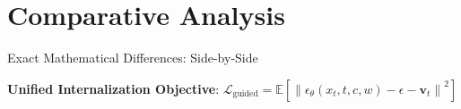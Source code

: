 \documentclass[aspectratio=169]{beamer}
\begin{document}
\section{Comparative Analysis}

\begin{frame}{Exact Mathematical Differences: Side-by-Side}
    \vspace{-0.3em}
    \begin{center}
        \scriptsize
        \textbf{Unified Internalization Objective}: \quad
        $\mathcal{L}_{\text{guided}} = \mathbb{E}\left[\left\|\epsilon_\theta(x_t, t, c, w) - \epsilon - \mathbf{v}_t\right\|^2\right]$
    \end{center}
    \vspace{-0.3em}


\end{frame}
\end{document}

